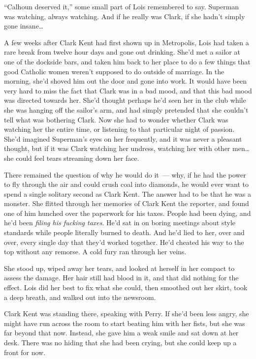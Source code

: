 \documentclass[ebook,12pt]{memoir}
\begin{document}
``Calhoun deserved it,'' some small part of Lois remembered to say.
Superman was watching, always watching. And if he really was Clark, if
she hadn't simply gone insane\ldots{}

A few weeks after Clark Kent had first shown up in Metropolis, Lois had
taken a rare break from twelve hour days and gone out drinking. She'd
met a sailor at one of the dockside bars, and taken him back to her
place to do a few things that good Catholic women weren't supposed to do
outside of marriage. In the morning, she'd shoved him out the door and
gone into work. It would have been very hard to miss the fact that Clark
was in a bad mood, and that this bad mood was directed towards her.
She'd thought perhaps he'd seen her in the club while she was hanging
off the sailor's arm, and had simply pretended that she couldn't tell
what was bothering Clark. Now she had to wonder whether Clark was
watching her the entire time, or listening to that particular night of
passion. She'd imagined Superman's eyes on her frequently, and it was
never a pleasant thought, but if it was Clark watching her undress,
watching her with other men\ldots{} she could feel tears streaming down
her face.

There remained the question of why he would do it~--- why, if he had the
power to fly through the air and could crush coal into diamonds, he
would ever want to spend a single solitary second as Clark Kent. The
answer had to be that he was a monster. She flitted through her memories
of Clark Kent the reporter, and found one of him hunched over the
paperwork for his taxes. People had been dying, and he'd been
\emph{filing his fucking taxes}. He'd sat in on boring meetings about
style standards while people literally burned to death. And he'd lied to
her, over and over, every single day that they'd worked together. He'd
cheated his way to the top without any remorse. A cold fury ran through
her veins.

She stood up, wiped away her tears, and looked at herself in her compact
to assess the damage. Her hair still had blood in it, and that did
nothing for the effect. Lois did her best to fix what she could, then
smoothed out her skirt, took a deep breath, and walked out into the
newsroom.

Clark Kent was standing there, speaking with Perry. If she'd been less
angry, she might have run across the room to start beating him with her
fists, but she was far beyond that now. Instead, she gave him a weak
smile and sat down at her desk. There was no hiding that she had been
crying, but she could keep up a front for now.
\end{document}
